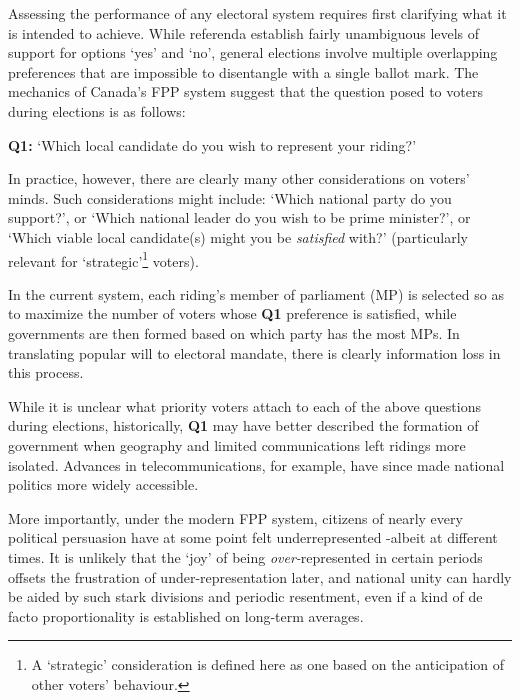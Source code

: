 Assessing the performance of any electoral system requires first clarifying what it is intended to achieve.
While referenda establish fairly unambiguous levels of support for options `yes' and `no', general elections involve multiple overlapping preferences that are impossible to disentangle with a single ballot mark.
The mechanics of Canada's FPP system suggest that the question posed to voters during elections is as follows:
\begin{tcolorbox}[colback=white!5!white,colframe=blue!55!black]
{\textbf{Q1:} } `Which local candidate do you wish to represent your riding?'
\end{tcolorbox}
In practice, however, there are clearly many other considerations on voters' minds.
Such considerations might include: `Which national party do you support?', or `Which national leader do you wish to be prime minister?', or `Which viable local candidate(s) might you be \emph{satisfied} with?' (particularly relevant for `strategic'\footnote{A `strategic'  consideration is defined here as one based on the anticipation of other voters' behaviour.} voters).

In the current system, each riding's member of parliament (MP) is selected so as to maximize the number of voters whose {\textbf{Q1}} preference is satisfied, while governments are then formed based on which party has the most MPs.
In translating popular will to electoral mandate, there is clearly information loss in this process.

While it is unclear what priority voters attach to each of the above questions during elections, historically, \textbf{Q1} may have better described the formation of government when geography and limited communications left ridings more isolated.
Advances in telecommunications, for example, have since made national politics more widely accessible.

%

More importantly, under the modern FPP system, citizens of nearly every political persuasion have at some point felt underrepresented \--albeit at different times. It is unlikely that the `joy' of being \emph{over-}represented in certain periods offsets the frustration of under-representation later, and
 national unity can hardly be aided by such stark divisions and periodic resentment, even if a kind of de facto proportionality is established on long-term averages.

